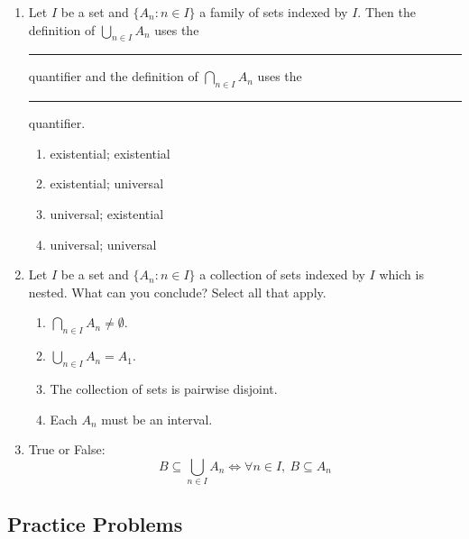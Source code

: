 \begin{enumerate}
\item Let $I$ be a set and $\{A_n : n \in I\}$ a family of sets indexed by $I$. Then the definition of $\bigcup_{n \in I} A_n$ uses the \rule{2.5cm}{0.15mm} quantifier and the definition of $\bigcap_{n \in I} A_n$ uses the \rule{2.5cm}{0.15mm} quantifier.
\begin{enumerate}
    \item existential; existential
    \item existential; universal
    \item universal; existential
    \item universal; universal
\end{enumerate}

\item Let $I$ be a set and $\{A_n : n \in I\}$ a collection of sets indexed by $I$ which is nested. What can you conclude? Select all that apply.
\begin{enumerate}
    \item $\bigcap_{n \in I} A_n \neq \emptyset$.
    \item $\bigcup_{n \in I} A_n = A_1$.
    \item The collection of sets is pairwise disjoint.
    \item Each $A_n$ must be an interval.
\end{enumerate}

\item True or False:
\[
    B\subseteq \bigcup_{n\in I}A_n\iff \forall n\in I,\ B\subseteq A_n
\]
\end{enumerate}

\subsection*{Practice Problems}

